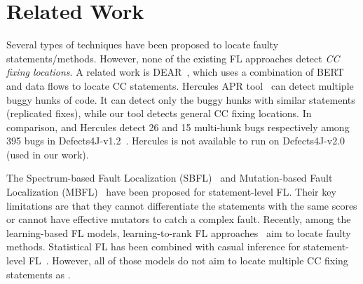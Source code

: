 \section{Related Work}

Several types of techniques have been proposed to locate faulty
statements/methods. However, none of the existing FL approaches detect
{\em CC fixing locations}.
A related work is DEAR~\cite{icse22}, which uses a combination
of BERT and data flows to locate CC statements.
Hercules APR tool~\cite{hercules-icse19} can detect multiple buggy
hunks of code. It can detect only the buggy hunks with similar
statements (replicated fixes), while our tool detects general CC
fixing locations. In comparison, {\tool} and Hercules detect 26 and 15
multi-hunk bugs respectively among 395 bugs in
Defects4J-v1.2~\cite{hercules-icse19}. Hercules is not
available to run on Defects4J-v2.0 (used in our work).

The Spectrum-based Fault Localization
(SBFL)~\cite{zhang2011localizing, abreu2007accuracy,
  jones2005empirical, abreu2006evaluation, naish2011model,
  wong2007effective, liblit-pldi05, lucia2014extended} and
Mutation-based Fault Localization (MBFL)~\cite{Metallaxis, MUSE,
  zhang2013injecting, budd1981mutation, zhang2010test, musco2017large}
have been proposed for statement-level FL. Their key limitations are
that they cannot differentiate the statements with the same scores or
cannot have effective mutators to catch a complex fault.
Recently, among the learning-based FL models, learning-to-rank FL
approaches~\cite{MULTRIC,TraPT,b2016learning,sohn2017fluccs} aim to
locate faulty methods.
Statistical FL has been combined with casual inference for
statement-level FL~\cite{kuccuk2021improving}. However, all of
those models do not aim to locate multiple CC fixing statements as {\tool}.

